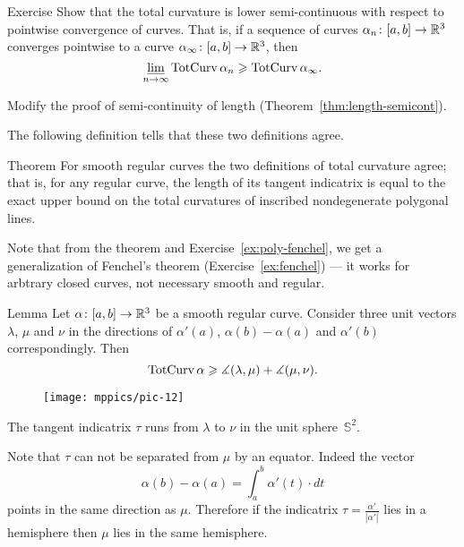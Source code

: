 \begin{thm}{Exercise}
Show that the total curvature is lower semi-continuous with respect to pointwise convergence of curves.
That is, if a sequence
of curves $\alpha_n\colon[a,b]\to \mathbb{R}^3$ converges pointwise 
to a curve $\alpha_\infty\:[a,b]\z\to \RR^3$, then 
\[\varliminf_{n\to\infty} \mathop{\rm TotCurv}\nolimits\alpha_n \geqslant \mathop{\rm TotCurv}\nolimits\alpha_\infty.\]
\end{thm}

 Modify the proof of semi-continuity of length (Theorem~\ref{thm:length-semicont}).


The following definition tells that these two definitions agree.

\begin{thm}{Theorem}\label{thm:total-curvature=}
For smooth regular curves the two definitions of total curvature agree;
that is, for any regular curve, the length of its tangent indicatrix is equal to the exact upper bound on the total curvatures of inscribed nondegenerate polygonal lines.
\end{thm}

Note that from the theorem and Exercise~\ref{ex:poly-fenchel}, we get a generalization of Fenchel's theorem (Exercise~\ref{ex:fenchel}) --- it works for arbtrary closed curves, not necessary smooth and regular.

\begin{thm}{Lemma}\label{lem:uvw}
Let $\alpha\colon[a,b]\to\mathbb{R}^3$ be a smooth regular curve.
Consider three unit vectors $\lambda$, $\mu$ and $\nu$ in the directions of
$\alpha'(a)$, $\alpha(b)-\alpha(a)$ and $\alpha'(b)$ correspondingly.
Then 
\[\mathop{\rm TotCurv}\nolimits\alpha\geqslant\measuredangle (\lambda,\mu)+\measuredangle (\mu,\nu).\]
\end{thm}

\begin{wrapfigure}{r}{45 mm}
\vskip-7mm
\centering
\texttt{[image: mppics/pic-12]}
\vskip0mm
\end{wrapfigure}

The tangent indicatrix $\tau$ runs from $\lambda$ to $\nu$ in the unit sphere~$\mathbb{S}^2$.

Note that $\tau$ can not be separated from $\mu$ by an equator.
Indeed the vector 
\[\alpha(b)-\alpha(a)=\int_a^b\alpha'(t)\cdot dt\]
points in the same direction as $\mu$.
Therefore if the indicatrix $\tau=\tfrac{\alpha'}{|\alpha'|}$ lies in a hemisphere then $\mu$ lies in the same hemisphere. 

